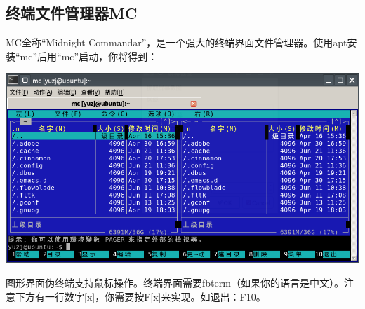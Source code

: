\documentclass{book}
\begin{document}
\subsection{终端文件管理器MC}
MC全称“Midnight Commandar”，是一个强大的终端界面文件管理器。使用apt安装“mc”后用“mc”启动，你将得到：
\begin{center}
	\includegraphics[scale=0.7]{pic/mc}
\end{center}
图形界面伪终端支持鼠标操作。终端界面需要fbterm（如果你的语言是中文）。注意下方有一行数字[x]，你需要按F[x]来实现。如退出：F10。
\end{document}
